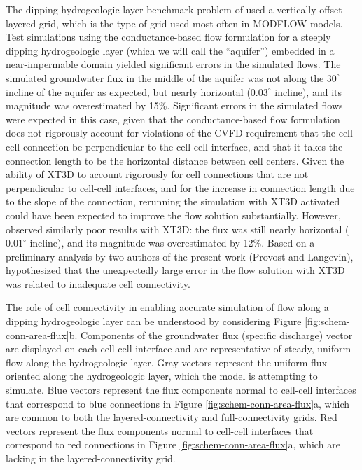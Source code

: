\documentclass{article}
\begin{document}
The dipping-hydrogeologic-layer benchmark problem of \cite{bardot2022} used a vertically offset layered grid, which is the type of grid used most often in MODFLOW models. Test simulations using the conductance-based flow formulation for a steeply dipping hydrogeologic layer (which we will call the ``aquifer'') embedded in a near-impermable domain yielded significant errors in the simulated flows. The simulated groundwater flux in the middle of the aquifer was not along the $30^{\circ}$ incline of the aquifer as expected, but nearly horizontal ($0.03^{\circ}$ incline), and its magnitude was overestimated by 15\%. Significant errors in the simulated flows were expected in this case, given that the conductance-based flow formulation does not rigorously account for violations of the CVFD requirement that the cell-cell connection be perpendicular to the cell-cell interface, and that it takes the connection length to be the horizontal distance between cell centers.  Given the ability of XT3D to account rigorously for cell connections that are not perpendicular to cell-cell interfaces, and for the increase in connection length due to the slope of the connection, rerunning the simulation with XT3D activated could have been expected to improve the flow solution substantially. However, \cite{bardot2022} observed similarly poor results with XT3D: the flux was still nearly horizontal ($0.01^{\circ}$ incline), and its magnitude was overestimated by 12\%. Based on a preliminary analysis by two authors of the present work (Provost and Langevin), \cite{bardot2022} hypothesized that the unexpectedly large error in the flow solution with XT3D was related to inadequate cell connectivity.

The role of cell connectivity in enabling accurate simulation of flow along a dipping hydrogeologic layer can be understood by considering Figure \ref{fig:schem-conn-area-flux}b. Components of the groundwater flux (specific discharge) vector are displayed on each cell-cell interface and are representative of steady, uniform flow along the hydrogeologic layer. Gray vectors represent the uniform flux oriented along the hydrogeologic layer, which the model is attempting to simulate. Blue vectors represent the flux components normal to cell-cell interfaces that correspond to blue connections in Figure \ref{fig:schem-conn-area-flux}a, which are common to both the layered-connectivity and full-connectivity grids. Red vectors represent the flux components normal to cell-cell interfaces that correspond to red connections in Figure \ref{fig:schem-conn-area-flux}a, which are lacking in the layered-connectivity grid.
\end{document}
